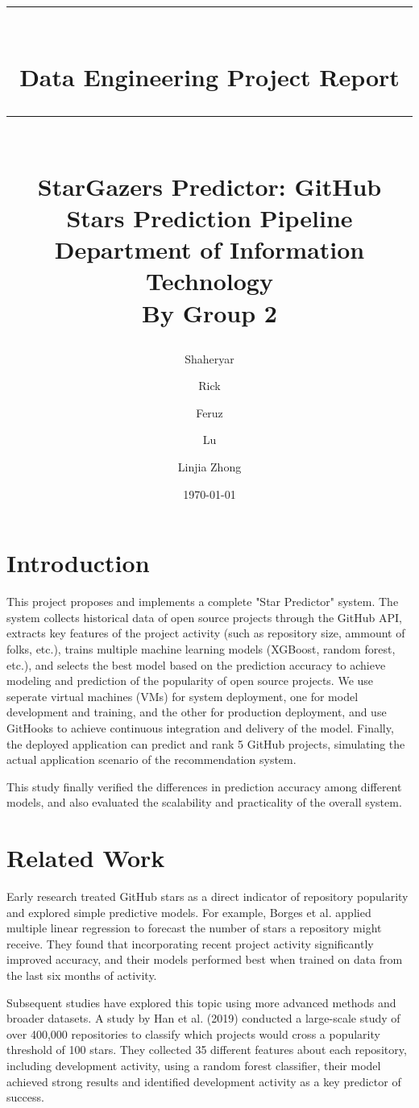 \documentclass[12pt,a4paper]{article}
\title{

    \rule{\textwidth}{4pt}\\[10pt]
    \huge \textbf{Data Engineering Project Report}
    \rule{\textwidth}{1pt}\\[15pt]
    
    \huge \color{darkgray}\textbf{StarGazers Predictor: GitHub Stars Prediction Pipeline}\\[15pt]
    
    \large \textbf{Department of Information Technology}\\[15pt]
    \large \textbf{By Group 2}\\[5pt]
}
\author{
    Shaheryar\\ 
    \and
    Rick\\
    \and
    Feruz\\
    \and
    Lu\\
    \and
    Linjia Zhong\\
    }
\date{\today} %
\begin{document}
\maketitle

\section{Introduction}
This project proposes and implements a complete "Star Predictor" system. The system collects historical data of open source projects through the GitHub API, extracts key features of the project activity (such as repository size, ammount of folks, etc.), trains multiple machine learning models (XGBoost, random forest, etc.), and selects the best model based on the prediction accuracy to achieve modeling and prediction of the popularity of open source projects. We use seperate virtual machines (VMs) for system deployment, one for model development and training, and the other for production deployment, and use GitHooks to achieve continuous integration and delivery of the model. Finally, the deployed application can predict and rank 5 GitHub projects, simulating the actual application scenario of the recommendation system.

This study finally verified the differences in prediction accuracy among different models, and also evaluated the scalability and practicality of the overall system.

\section{Related Work}
Early research treated GitHub stars as a direct indicator of repository popularity and explored simple predictive models. For example, Borges et al.\cite{3} applied multiple linear regression to forecast the number of stars a repository might receive. They found that incorporating recent project activity significantly improved accuracy, and their models performed best when trained on data from the last six months of activity. 

Subsequent studies have explored this topic using more advanced methods and broader datasets. A study by Han et al. (2019) conducted a large-scale study of over 400,000 repositories to classify which projects would cross a popularity threshold of 100 stars. They collected 35 different features about each repository, including development activity, using a random forest classifier, their model achieved strong results and identified development activity as a key predictor of success.\cite{1}  
\end{document}
